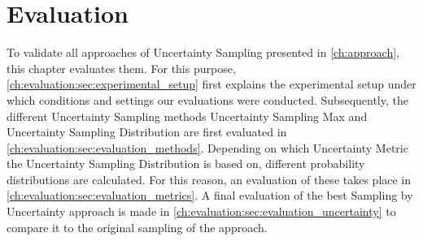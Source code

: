 \chapter{Evaluation}
\label{ch:evaluation}

To validate all approaches of Uncertainty Sampling presented in \autoref{ch:approach}, this chapter evaluates them.
For this purpose, \autoref{ch:evaluation:sec:experimental_setup} first explains the experimental setup under which conditions and settings our evaluations were conducted.
Subsequently, the different Uncertainty Sampling methods Uncertainty Sampling Max and Uncertainty Sampling Distribution are first evaluated in \autoref{ch:evaluation:sec:evaluation_methods}.
Depending on which Uncertainty Metric the Uncertainty Sampling Distribution is based on, different probability distributions are calculated.
For this reason, an evaluation of these takes place in \autoref{ch:evaluation:sec:evaluation_metrics}.
A final evaluation of the best Sampling by Uncertainty approach is made in \autoref{ch:evaluation:sec:evaluation_uncertainty} to compare it to the original sampling of the \kbgan approach.



\newpage



\newpage



\newpage



\newpage





